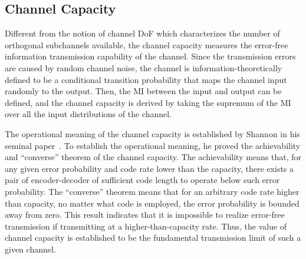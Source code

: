 \documentclass[journal,twocolumn]{IEEEtran}
\begin{document}


\subsection{Channel Capacity}
\label{Sec_2_Subsec_2}
Different from the notion of channel DoF which characterizes the number of orthogonal subchannels available, the channel capacity measures the error-free information transmission capability of the channel. 
Since the transmission errors are caused by random channel noise, the channel is information-theoretically defined to be a conditional transition probability that maps the channel input randomly to the output. 
Then, the MI between the input and output can be defined, and the channel capacity is derived by taking the supremum of the MI over all the input distributions of the channel. 

The operational meaning of the channel capacity is established by Shannon in his seminal paper~\cite{shannon1948mathematical}. To establish the operational meaning, he proved the achievability and ``converse'' theorem of the channel capacity. The achievability means that, for any given error probability and code rate lower than the capacity, there exists a pair of encoder-decoder of sufficient code length to operate below such error probability. 
The ``converse'' theorem means that for an arbitrary code rate higher than capacity, no matter what code is employed, the error probability is bounded away from zero. This result indicates that it is impossible to realize error-free transmission if transmitting at a higher-than-capacity rate. Thus, the value of channel capacity is established to be the fundamental transmission limit of such a given channel. 
\end{document}
